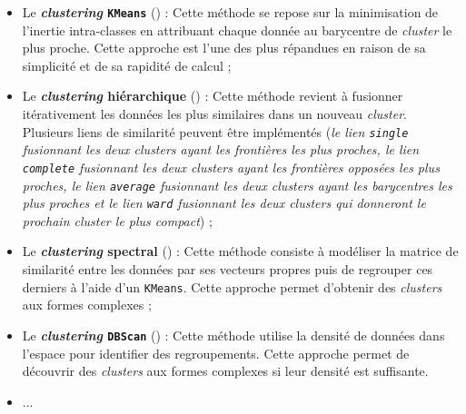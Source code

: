 		\begin{itemize}
			\item Le \textbf{\textit{clustering} \texttt{KMeans}} (\cite{macqueen:1967:methods-classification-analysis}) :
			Cette méthode se repose sur la minimisation de l'inertie intra-classes en attribuant chaque donnée au barycentre de \textit{cluster} le plus proche.
			Cette approche est l'une des plus répandues en raison de sa simplicité et de sa rapidité de calcul ;
			\item Le \textbf{\textit{clustering} hiérarchique} (\cite{murtagh-contreras:2012:algorithms-hierarchical-clustering}) :
			Cette méthode revient à fusionner itérativement les données les plus similaires dans un nouveau \textit{cluster}.
			Plusieurs liens de similarité peuvent être implémentés (\textit{le lien \texttt{single} fusionnant les deux \textit{clusters} ayant les frontières les plus proches, le lien \texttt{complete} fusionnant les deux \textit{clusters} ayant les frontières opposées les plus proches, le lien \texttt{average} fusionnant les deux \textit{clusters} ayant les barycentres les plus proches et le lien \texttt{ward} fusionnant les deux \textit{clusters} qui donneront le prochain \textit{cluster} le plus compact}) ;
			\item Le \textbf{\textit{clustering} spectral} (\cite{ng-etal:2002:spectral-clustering-analysis}) :
			Cette méthode consiste à modéliser la matrice de similarité entre les données par ses vecteurs propres puis de regrouper ces derniers à l'aide d'un \texttt{KMeans}.
			Cette approche permet d'obtenir des \textit{clusters} aux formes complexes ;
			\item Le \textbf{\textit{clustering} \texttt{DBScan}} (\cite{ester-etal:1996:densitybased-algorithm-discovering}) :
			Cette méthode utilise la densité de données dans l'espace pour identifier des regroupements.
			Cette approche permet de découvrir des \textit{clusters} aux formes complexes si leur densité est suffisante.
			\item ...
		\end{itemize}
		
